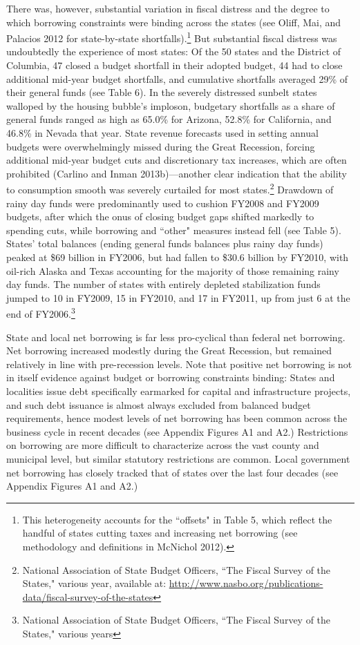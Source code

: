 \documentclass[12pt,letterpaper]{article}
\begin{document}
There was, however, substantial variation in fiscal distress and the degree to which borrowing constraints were binding across the states (see Oliff, Mai, and Palacios 2012 for state-by-state shortfalls).\footnote{This heterogeneity accounts for the ``offsets" in Table 5, which reflect the handful of states cutting taxes and increasing net borrowing (see methodology and definitions in McNichol 2012).}  But substantial fiscal distress was undoubtedly the experience of most states: Of the 50 states and the District of Columbia, 47 closed a budget shortfall in their adopted budget, 44 had to close additional mid-year budget shortfalls, and cumulative shortfalls averaged 29\% of their general funds (see Table 6). In the severely distressed sunbelt states walloped by the housing bubble's imploson, budgetary shortfalls as a share of general funds ranged as high as 65.0\% for Arizona, 52.8\% for California, and 46.8\% in Nevada that year. State revenue forecasts used in setting annual budgets were overwhelmingly missed during the Great Recession, forcing additional mid-year budget cuts and discretionary tax increases, which are often prohibited (Carlino and Inman 2013b)---another clear indication that the ability to consumption smooth was severely curtailed for most states.\footnote{National Association of State Budget Officers, ``The Fiscal Survey of the States," various year, available at: \url{http://www.nasbo.org/publications-data/fiscal-survey-of-the-states}}  Drawdown of rainy day funds were predominantly used to cushion FY2008 and FY2009 budgets, after which the onus of closing budget gaps shifted markedly to spending cuts, while borrowing and ``other" measures instead fell (see Table 5). States' total balances (ending general funds balances plus rainy day funds) peaked at \$69 billion in FY2006, but had fallen to \$30.6 billion by FY2010, with oil-rich Alaska and Texas accounting for the majority of those remaining rainy day funds. The number of states with entirely depleted stabilization funds jumped to 10 in FY2009, 15 in FY2010, and 17 in FY2011, up from just 6 at the end of FY2006.\footnote{National Association of State Budget Officers, ``The Fiscal Survey of the States," various years} 

State and local net borrowing is far less pro-cyclical than federal net borrowing. Net borrowing increased modestly during the Great Recession, but remained relatively in line with pre-recession levels. Note that positive net borrowing is not in itself evidence against budget or borrowing constraints binding: States and localities issue debt specifically earmarked for capital and infrastructure projects, and such debt issuance is almost always excluded from balanced budget requirements, hence modest levels of net borrowing has been common across the business cycle in recent decades (see Appendix Figures A1 and A2.) Restrictions on borrowing are more difficult to characterize across the vast county and municipal level, but similar statutory restrictions are common. Local government net borrowing has closely tracked that of states over the last four decades (see Appendix Figures A1 and A2.) 
\end{document}
